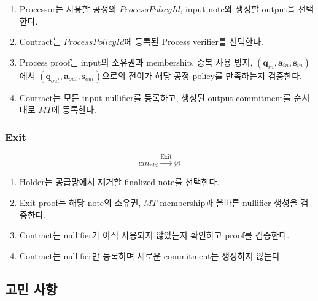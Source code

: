 \documentclass[11pt,a4paper]{extarticle}
\begin{document}
\begin{enumerate}[label=\textbf{\arabic*.},leftmargin=18pt]
  \item Processor는 사용할 공정의 \(\mathit{ProcessPolicyId}\), input note와
        생성할 output을 선택한다.
  \item Contract는 \(\mathit{ProcessPolicyId}\)에 등록된 Process verifier를
        선택한다.
  \item Process proof는 input의 소유권과 membership, 중복 사용 방지,
        \((\mathbf{q}_{in},\mathbf{a}_{in},\mathbf{s}_{in})\)에서
        \((\mathbf{q}_{out},\mathbf{a}_{out},\mathbf{s}_{out})\)으로의 전이가
        해당 공정 policy를 만족하는지 검증한다.
  \item Contract는 모든 input nullifier를 등록하고, 생성된 output commitment를
        순서대로 \(MT\)에 등록한다.
\end{enumerate}

\subsubsection*{Exit}

\[
  cm_{old}
  \xrightarrow{\mathrm{Exit}}
  \varnothing
\]

\begin{enumerate}[label=\textbf{\arabic*.},leftmargin=18pt]
  \item Holder는 공급망에서 제거할 finalized note를 선택한다.
  \item Exit proof는 해당 note의 소유권, \(MT\) membership과 올바른
        nullifier 생성을 검증한다.
  \item Contract는 nullifier가 아직 사용되지 않았는지 확인하고 proof를 검증한다.
  \item Contract는 nullifier만 등록하며 새로운 commitment는 생성하지 않는다.
\end{enumerate}

\subsection{고민 사항}
\end{document}
